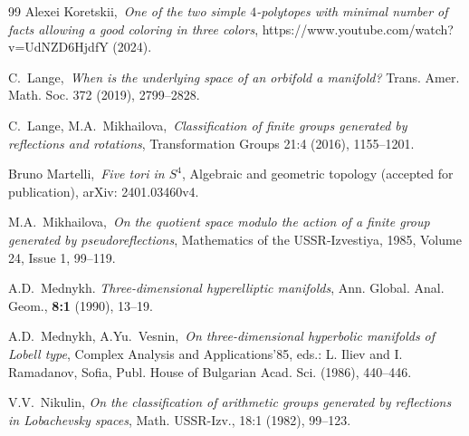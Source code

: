 \documentclass[12pt]{amsart}
\theoremstyle{definition}
\theoremstyle{remark}
\begin{document}
\begin{thebibliography}{99}
Alexei Koretskii,\,
\emph{One of the two simple $4$-polytopes with minimal number 
of facts allowing a good coloring in three colors},
https://www.youtube.com/watch?v=UdNZD6HjdfY (2024).



C.~Lange,\,
\emph{When is the underlying space of an orbifold a manifold?}
Trans. Amer. Math. Soc. 372 (2019), 2799--2828.

C.~Lange, M.A.~Mikhailova,\,
\emph{Classification of finite groups generated by reflections and rotations},
Transformation Groups 21:4 (2016), 1155--1201.

Bruno Martelli,\, 
\emph{Five tori in $S^4$},
Algebraic and geometric topology (accepted for publication), arXiv: 2401.03460v4.

M.A.~Mikhailova,\,
\emph{On the quotient space modulo the action of a finite group generated by pseudoreflections}, 
Mathematics of the USSR-Izvestiya, 1985, Volume 24, Issue 1, 99--119.

A.D.~Mednykh.
\emph{Three-dimensional hyperelliptic manifolds},
Ann. Global. Anal. Geom., {\bf 8:1} (1990), 13--19.

A.D.~Mednykh, A.Yu.~Vesnin,\,
\emph{On three-dimensional hyperbolic manifolds of Lobell type},
Complex Analysis and Applications'85, eds.: L. Iliev and I. Ramadanov, Sofia, Publ. House
of Bulgarian Acad. Sci. (1986), 440--446.




V.V.~Nikulin, 
\emph{On the classification of arithmetic groups
generated by reflections in Lobachevsky spaces}, 
Math. USSR-Izv., 18:1 (1982),
99--123.


\end{thebibliography}
\end{document}
